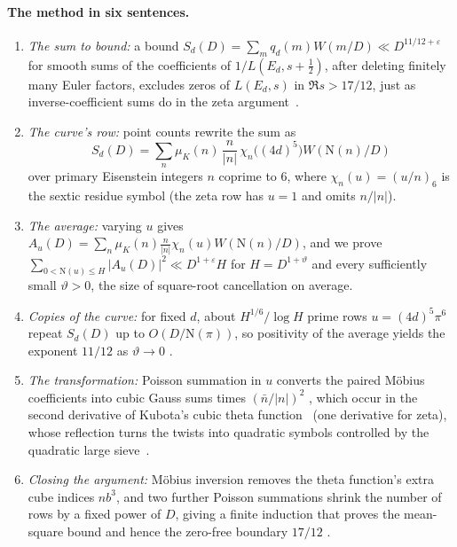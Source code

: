 \documentclass[11pt]{article}
\numberwithin{equation}{section}
\newcommand{\N}{\mathrm N}
\newcommand{\muk}{\mu_K}
\begin{document}
\paragraph{The method in six sentences.}
\begin{enumerate}
\item \emph{The sum to bound:} a bound
 $S_d(D)=\sum_mq_d(m)W(m/D)\ll D^{11/12+\varepsilon}$ for smooth sums of the
 coefficients of $1/L(E_d,s+\frac12)$, after deleting finitely many Euler factors,
 excludes zeros of $L(E_d,s)$ in $\Re s>17/12$, just as inverse-coefficient sums do
 in the zeta argument~\cite[Theorem~1.1]{OAI1112}.
\item \emph{The curve's row:} point counts rewrite the sum as
 \begin{equation}\label{eq:d001}
  S_d(D)=\sum_n\muk(n)\,\frac n{|n|}\,\chi_n\bigl((4d)^5\bigr)W(\N(n)/D)
 \end{equation}
 over primary Eisenstein integers $n$ coprime to $6$, where $\chi_n(u)=(u/n)_6$
 is the sextic residue symbol (the zeta row has $u=1$ and omits $n/|n|$).
\item \emph{The average:} varying $u$ gives
 $A_u(D)=\sum_n\muk(n)\frac n{|n|}\chi_n(u)W(\N(n)/D)$, and we prove
 $\sum_{0<\N(u)\le H}|A_u(D)|^2\ll D^{1+\varepsilon}H$ for
 $H=D^{1+\vartheta}$ and every sufficiently small $\vartheta>0$, the size of
 square-root cancellation on average.
\item \emph{Copies of the curve:} for fixed $d$, about $H^{1/6}/\log H$ prime
 rows $u=(4d)^5\pi^6$ repeat $S_d(D)$ up to $O(D/\N(\pi))$, so positivity of
 the average yields the exponent $11/12$ as $\vartheta\to0$
 \cite[Sections~2--3]{OAI1112}.
\item \emph{The transformation:} Poisson summation in $u$ converts the paired
 M\"obius coefficients into cubic Gauss sums times $(\bar n/|n|)^2$
 \cite[Lemma~4.1]{OAI1112}, which occur in the second derivative of Kubota's
 cubic theta function~\cite{Kub69,Pat77} (one derivative for zeta), whose
 reflection turns the twists into quadratic symbols controlled by the quadratic
 large sieve~\cite{HB95,GL}.
\item \emph{Closing the argument:} M\"obius inversion removes the theta function's
 extra cube indices $nb^3$, and two further Poisson summations shrink the number
 of rows by a fixed power of $D$, giving a finite induction that proves the
 mean-square bound and hence the zero-free boundary $17/12$
 \cite[Lemma~5.3, Section~7 and Section~5.5]{OAI1112}.
\end{enumerate}
\end{document}

